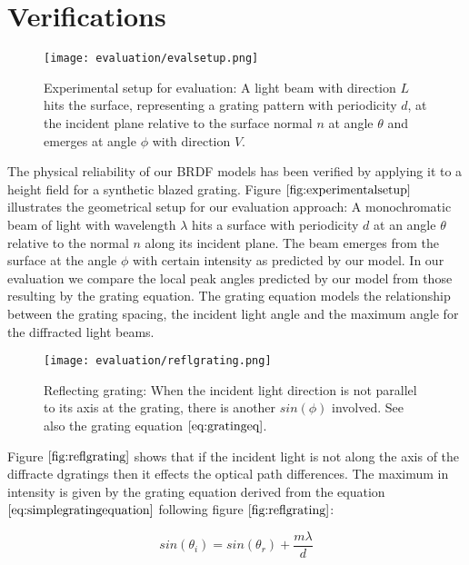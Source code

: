 \section{Verifications}
\label{sec:approachesverifications}
\begin{figure}[H]
  \centering
  \texttt{[image: evaluation/evalsetup.png]}
  \caption[Experimental Setup]{Experimental setup for evaluation: A light beam with direction $L$ hits the surface, representing a grating pattern with periodicity $d$, at the incident plane relative to the surface normal $n$ at angle $\theta$ and emerges at angle $\phi$ with direction $V$.}
  \label{fig:experimentalsetup}
\end{figure}

The physical reliability of our BRDF models has been verified by applying it to a height field for a synthetic blazed grating. Figure $\ref{fig:experimentalsetup}$ illustrates the geometrical setup for our evaluation approach: A monochromatic beam of light with wavelength $\lambda$ hits a surface with periodicity $d$ at an angle $\theta$ relative to the normal $n$ along its incident plane. The beam emerges from the surface at the angle $\phi$ with certain intensity as predicted by our model. In our evaluation we compare the local peak angles predicted by our model from those resulting by the grating equation. The grating equation models the relationship between the grating spacing, the incident light angle and the maximum angle for the diffracted light beams. 

\begin{figure}[H]
  \centering
  \texttt{[image: evaluation/reflgrating.png]}
  \caption[Reflective Grating]{Reflecting grating: When the incident light direction is not parallel to its axis at the grating, there is another $sin(\phi)$ involved. See also the grating equation $\ref{eq:gratingeq}$.}
  \label{fig:reflgrating}
\end{figure}


Figure $\ref{fig:reflgrating}$ shows that if the incident light is not along the axis of the diffracte dgratings then it effects the optical path differences. The maximum in intensity is given by the grating equation derived from the equation $\ref{eq:simplegratingequation}$ following figure $\ref{fig:reflgrating}$: 

\begin{equation}
  sin(\theta_i) = sin(\theta_r) + \frac{m \lambda}{d}
\label{eq:gratingeq}
\end{equation}

